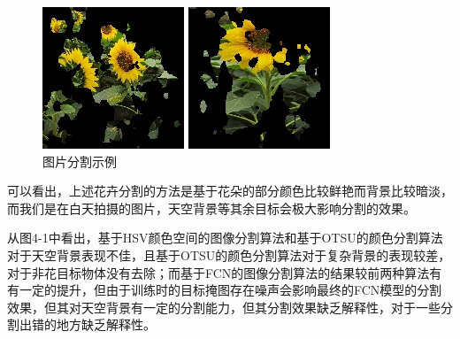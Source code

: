 \documentclass[supercite]{HustGraduPaper}
\begin{document}
\begin{sloppypar}
\begin{figure}[H]
\begin{minipage}[t]{0.24\textwidth}
        \includegraphics[scale=0.55]{seg23.jpg}
      
        \includegraphics[scale=0.55]{seg33.jpg}
        \end{minipage}
   \caption{图片分割示例}
   \end{figure}

   可以看出，上述花卉分割的方法是基于花朵的部分颜色比较鲜艳而背景比较暗淡，而我们是在白天拍摄的图片，天空背景等其余目标会极大影响分割的效果。

   从图4-1中看出，基于HSV颜色空间的图像分割算法和基于OTSU的颜色分割算法对于天空背景表现不佳，且基于OTSU的颜色分割算法对于复杂背景的表现较差，对于非花目标物体没有去除；而基于FCN的图像分割算法的结果较前两种算法有有一定的提升，但由于训练时的目标掩图存在噪声会影响最终的FCN模型的分割效果，但其对天空背景有一定的分割能力，但其分割效果缺乏解释性，对于一些分割出错的地方缺乏解释性。

\end{sloppypar}
\end{document}

